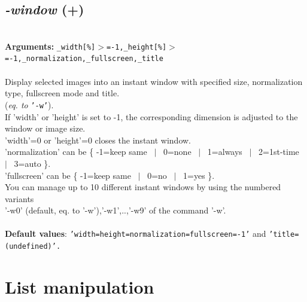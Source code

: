 \documentclass[a4paper,11pt,twoside]{book}
\begin{document}
\subsection{\emph{-window} (+)}\vspace*{-0.5em}
~\\\textbf{Arguments: } 
{\small \texttt{\_width[\%]$>$=-1,\_height[\%]$>$=-1,\_normalization,\_fullscreen,\_title}}\\~\\
Display selected images into an instant window with specified size, normalization type,
fullscreen mode and title.
~\\(\emph{eq. to} {\small \texttt{'-w'}}).
~\\If 'width' or 'height' is set to -1, the corresponding dimension is adjusted to the window
or image size.
~\\'width'=0 or 'height'=0 closes the instant window.
~\\'normalization' can be \{ -1=keep same ~$|$~ 0=none ~$|$~ 1=always ~$|$~ 2=1st-time ~$|$~ 3=auto \}.
~\\'fullscreen' can be \{ -1=keep same ~$|$~ 0=no ~$|$~ 1=yes \}.
~\\You can manage up to 10 different instant windows by using the numbered variants
~\\'-w0' (default, eq. to '-w'),'-w1',..,'-w9' of the command '-w'.
~\\~\\\textbf{Default values}: {\small \texttt{'width=height=normalization=fullscreen=-1'} and \texttt{'title=(undefined)'.}}

\section{List manipulation}
\end{document}
